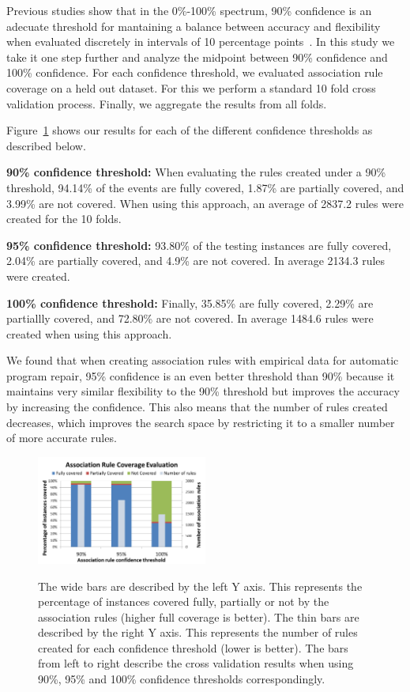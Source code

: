\documentclass[sigconf]{acmart}
\begin{document}
Previous studies show that in the 0\%-100\% spectrum, 
90\% confidence is an adecuate threshold 
for mantaining a balance between accuracy and flexibility when evaluated
discretely in intervals of 10 percentage points~\cite{Soto18}.
In this study we take it one step further and analyze the midpoint between 90\%
confidence and 100\% confidence.
For each confidence
threshold, we evaluated association rule coverage on a held out
dataset. For this we perform
a standard 10 fold cross validation process. Finally, we aggregate the results
from all folds.

Figure~\ref{ruleEvaluation} shows our results for each of the 
different confidence thresholds as described below.

\noindent\textbf{90\% confidence threshold:}
When evaluating the rules created under a 90\% threshold, 94.14\% of the 
events are fully covered, 1.87\% are partially covered, and 3.99\% are
not covered. When using this approach, an average of 2837.2 rules were
created for the 10 folds.

\noindent\textbf{95\% confidence threshold:}
93.80\% of the testing instances are fully covered, 2.04\% are
partially covered, and 4.9\% are not covered. In average 2134.3 rules
were created.

\noindent\textbf{100\% confidence threshold:}
Finally, 35.85\% are fully
covered, 2.29\% are partiallly covered, and 72.80\% are not covered.
In average 1484.6 rules were created when using this approach.

We found that when creating association
rules with empirical data for automatic program repair, 95\% confidence
is an even better threshold than 90\% because it maintains very similar flexibility 
to the 90\% threshold but improves the accuracy by increasing the confidence. 
This also means that the number of rules created decreases, which improves
the search space by restricting it to a smaller number of more accurate rules.
 

\begin{figure}[h]
\caption{The wide bars are described by the left Y axis. This represents
the percentage of instances covered
fully, partially or not by the association rules (higher full coverage is better). 
The thin bars are described by the right Y axis.
This represents the number of rules created for each confidence threshold 
(lower is better).
The bars from left to right describe the cross validation
results when using 90\%, 95\% and 100\% confidence thresholds correspondingly.}
\centering
\includegraphics[width=0.5\textwidth]{images/assocRuleEval.png}
\label{ruleEvaluation}
\end{figure}
\end{document}
